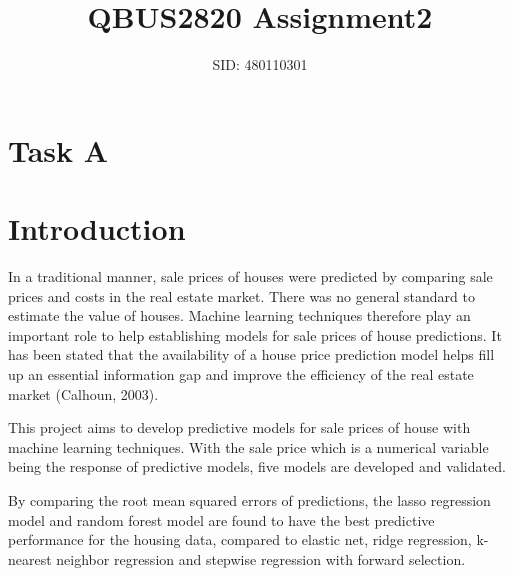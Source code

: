 \documentclass[letterpaper,12pt,twoside,]{pinp}
\title{QBUS2820 Assignment2}
\author[a]{SID: 480110301}
\begin{document}
\verticaladjustment{-2pt}

\maketitle
\thispagestyle{firststyle}




\hypertarget{task-a}{%
\section{Task A}\label{task-a}}

\hypertarget{introduction}{%
\section{Introduction}\label{introduction}}

In a traditional manner, sale prices of houses were predicted by
comparing sale prices and costs in the real estate market. There was no
general standard to estimate the value of houses. Machine learning
techniques therefore play an important role to help establishing models
for sale prices of house predictions. It has been stated that the
availability of a house price prediction model helps fill up an
essential information gap and improve the efficiency of the real estate
market (Calhoun, 2003).

This project aims to develop predictive models for sale prices of house
with machine learning techniques. With the sale price which is a
numerical variable being the response of predictive models, five models
are developed and validated.

By comparing the root mean squared errors of predictions, the lasso
regression model and random forest model are found to have the best
predictive performance for the housing data, compared to elastic net,
ridge regression, k-nearest neighbor regression and stepwise regression
with forward selection.
\end{document}
